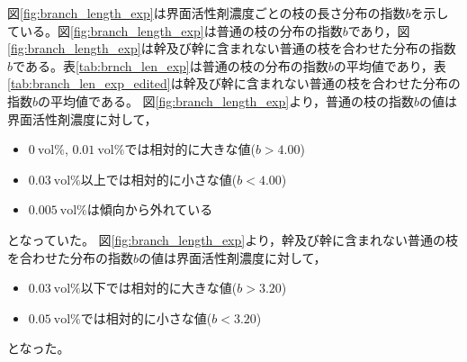 \documentclass[autodetect-engine,dvi=dvipdfmx,a4paper,ja=standard,oneside,openany,11pt]{bxjsbook}
\begin{document}
図\ref{fig:branch_length_exp}は界面活性剤濃度ごとの枝の長さ分布の指数$b$を示している。図\ref{fig:branch_length_exp}は普通の枝の分布の指数$b$であり，図\ref{fig:branch_length_exp}は幹及び幹に含まれない普通の枝を合わせた分布の指数$b$である。表\ref{tab:brnch_len_exp}は普通の枝の分布の指数$b$の平均値であり，表\ref{tab:branch_len_exp_edited}は幹及び幹に含まれない普通の枝を合わせた分布の指数$b$の平均値である。
図\ref{fig:branch_length_exp}より，普通の枝の指数$b$の値は界面活性剤濃度に対して，
\begin{itemize}
  \item $\SI{0}{\mathrm{vol}\%}$, $\SI{0.01}{\mathrm{vol}\%}$では相対的に大きな値($b>4.00$)
  \item $\SI{0.03}{\mathrm{vol}\%}$以上では相対的に小さな値($b<4.00$)
  \item $\SI{0.005}{\mathrm{vol}\%}$は傾向から外れている
\end{itemize}
となっていた。
図\ref{fig:branch_length_exp}より，幹及び幹に含まれない普通の枝を合わせた分布の指数$b$の値は界面活性剤濃度に対して，
\begin{itemize}
  \item $\SI{0.03}{\mathrm{vol}\%}$以下では相対的に大きな値($b>3.20$)
  \item $\SI{0.05}{\mathrm{vol}\%}$では相対的に小さな値($b<3.20$)
\end{itemize}
となった。
\ifdraft{
  
  
}{}
\end{document}
